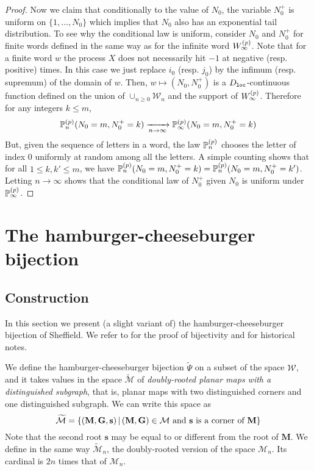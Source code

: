 \documentclass[a4paper]{article}
\newcommand*{\map}{\mathbf}
\newcommand*{\M}{\mathcal{M}}
\newcommand*{\W}{\mathcal{W}}
\newcommand*{\wt}{\widetilde}
\begin{document}
\begin{proof}
Now we claim that conditionally to the value of $N_0$, the variable 
$N_0^+$ is uniform on $\{1,\ldots,N_0\}$ which implies that $N_0$ also has an exponential tail distribution.
To see why the conditional law is uniform, consider $N_0$ and $N_0^+$ for finite words defined in the same way as for the infinite word $W^{(p)}_\infty$.
Note that for a finite word $w$ the process $X$ does not necessarily hit $-1$ at negative (resp. positive) times.
In this case we just replace $i_0$ (resp. $j_0$) by the infimum (resp. supremum) of the domain of $w$.
Then, $w\mapsto (N_0,N_0^+)$ is a $D_{\mathtt{loc}}$-continuous function defined on the union of $\cup_{n\geq 0}\W_n$ and the support of $W^{(p)}_\infty$.
Therefore for any integers $k\leq m$,
\begin{equation}
					\mathbb{P}^{(p)}_n(N_0=m,N_0^+=k)
\xrightarrow[n\to\infty]{\text{}}	\mathbb{P}^{(p)}_\infty(N_0=m,N_0^+=k)
\end{equation}
But, given the sequence of letters in a word, the law $\mathbb{P}^{(p)}_n$ chooses the letter of index 0 uniformly at random among all the letters.
A simple counting shows that for all $1\!\leq\! k,k'\!\leq\! m$,
we have $\mathbb{P}^{(p)}_n(N_0=m,N_0^+=k)  =  \mathbb{P}^{(p)}_n(N_0=m,N_0^+=k')$.
Letting $n\to\infty$ shows that the conditional law of $N_0^+$ given $N_0$ is uniform under $\mathbb{P}^{(p)}_\infty$.
\end{proof}


\section{The hamburger-cheeseburger bijection}\label{sec:maps}

\subsection{Construction}
In this section we present (a slight variant of) the hamburger-cheeseburger bijection of Sheffield. 
We refer to \cite{She11} for the proof of bijectivity and for historical notes.

We define the hamburger-cheeseburger bijection $\wt{\Psi}$ on a subset of the space $\W$, and it takes values in the space $\wt{\M}$ of \emph{doubly-rooted planar maps with a distinguished subgraph}, that is, planar maps with two distinguished corners and one distinguished subgraph.
We can write this space as
\begin{equation}
	\wt{\M} = \set{(\map{M,G,s})}{ (\map{M,G})\in\M
								\text{ and }\map{s}\text{ is a corner of }\map{M}}
\end{equation}
Note that the second root $\map{s}$ may be equal to or different from the root of $\map{M}$.
We define in the same way $\wt{\M}_n$, the doubly-rooted version of the space $\M_n$.
Its cardinal is $2n$ times that of $\M_n$.
\end{document}
